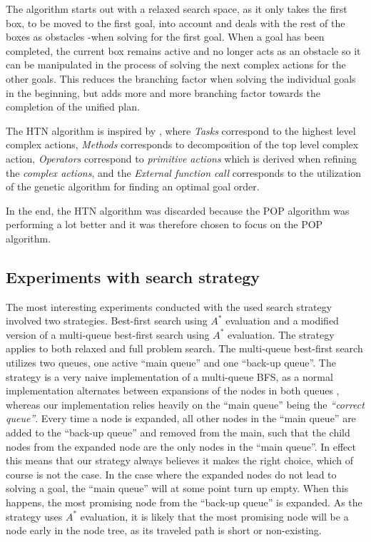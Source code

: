 \documentclass[Main]{subfiles}
\begin{document}
The algorithm starts out with a relaxed search space, as it only takes the first box, to be moved to the first goal, into account and deals with the rest of the boxes as obstacles -when solving for the first goal.
When a goal has been completed, the current box remains active and no longer acts as an obstacle so it can be manipulated in the process of solving the next complex actions for the other goals.
This reduces the branching factor when solving the individual goals in the beginning, but adds more and more branching factor towards the completion of the unified plan.

The HTN algorithm is inspired by \cite{nau2003shop2}, where \textit{Tasks} correspond to the highest level complex actions, \textit{Methods} corresponds to decomposition of the top level complex action, \textit{Operators} correspond to \textit{primitive actions} which is derived when refining the \textit{complex actions}, and the \textit{External function call} corresponds to the utilization of the genetic algorithm for finding an optimal goal order.

In the end, the HTN algorithm was discarded because the POP algorithm was performing a lot better and it was therefore chosen to focus on the POP algorithm.





\subsection{Experiments with search strategy}
\label{sec:experiments_search_strategy}

The most interesting experiments conducted with the used search strategy involved two strategies. Best-first search using $A^*$ evaluation and a modified version of a multi-queue best-first search using $A^*$ evaluation. The strategy applies to both relaxed and full problem search. 
The multi-queue best-first search utilizes two queues, one active ``main queue'' and one ``back-up queue''. The strategy is a very naive implementation of a multi-queue BFS, as a normal implementation alternates between expansions of the nodes in both queues \citep{hector2013a}, whereas our implementation relies heavily on the ``main queue'' being the \textit{``correct queue''}. Every time a node is expanded, all other nodes in the ``main queue'' are added to the ``back-up queue'' and removed from the main, such that the child nodes from the expanded node are the only nodes in the ``main queue''. In effect this means that our strategy always believes it makes the right choice, which of course is not the case. In the case where the expanded nodes do not lead to solving a goal, the ``main queue'' will at some point turn up empty. When this happens, the most promising node from the ``back-up queue'' is expanded. As the strategy uses $A^*$ evaluation, it is likely that the most promising node will be a node early in the node tree, as its traveled path is short or non-existing. 
\end{document}
